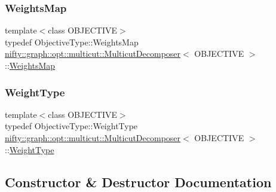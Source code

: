 \subsubsection{\texorpdfstring{Weights\+Map}{WeightsMap}}
{\footnotesize\ttfamily template$<$class O\+B\+J\+E\+C\+T\+I\+VE$>$ \\
typedef Objective\+Type\+::\+Weights\+Map \hyperlink{classnifty_1_1graph_1_1opt_1_1multicut_1_1MulticutDecomposer}{nifty\+::graph\+::opt\+::multicut\+::\+Multicut\+Decomposer}$<$ O\+B\+J\+E\+C\+T\+I\+VE $>$\+::\hyperlink{classnifty_1_1graph_1_1opt_1_1multicut_1_1MulticutDecomposer_a9834b97c23c60efe89b26261fc033a75}{Weights\+Map}}

\mbox{\label{classnifty_1_1graph_1_1opt_1_1multicut_1_1MulticutDecomposer_a9507b924e75719283340e9ddbf830b27}} 
\subsubsection{\texorpdfstring{Weight\+Type}{WeightType}}
{\footnotesize\ttfamily template$<$class O\+B\+J\+E\+C\+T\+I\+VE$>$ \\
typedef Objective\+Type\+::\+Weight\+Type \hyperlink{classnifty_1_1graph_1_1opt_1_1multicut_1_1MulticutDecomposer}{nifty\+::graph\+::opt\+::multicut\+::\+Multicut\+Decomposer}$<$ O\+B\+J\+E\+C\+T\+I\+VE $>$\+::\hyperlink{classnifty_1_1graph_1_1opt_1_1multicut_1_1MulticutDecomposer_a9507b924e75719283340e9ddbf830b27}{Weight\+Type}}



\subsection{Constructor \& Destructor Documentation}
\mbox{\label{classnifty_1_1graph_1_1opt_1_1multicut_1_1MulticutDecomposer_a8d2e381e68e3c0b9d91a57b05d8dfcc8}} 
